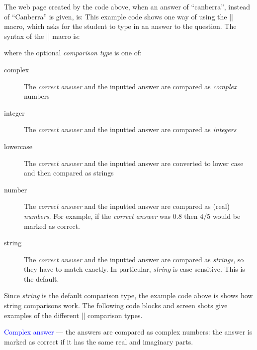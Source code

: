 \documentclass[svgnames]{article}
\begin{document}
  The web page created by the code above, when an answer of
  ``canberra'', instead of ``Canberra'' is given, is:
  This example code shows one way of using the \LatexCode|\answer| macro, which
  asks for the student to type in an answer to the question. The syntax of the
  \LatexCode|\answer| macro is:
  \begin{latexcode}
  \end{latexcode}
  where the optional \textit{comparison type} is one of:
  \begin{description}
      \item[complex] 
      The \textit{correct answer} and the inputted answer
      are compared as \textit{complex} numbers
      \item[integer] 
      The \textit{correct answer} and the inputted answer
      are compared as \textit{integers}
      \item[lowercase] 
      The \textit{correct answer} and the inputted answer
      are converted to lower case and then compared as strings
      \item[number] 
      The \textit{correct answer} and the inputted answer
      are compared as (real) \textit{numbers}. For example, if the
      \textit{correct answer} was $0.8$ then $4/5$ would be marked as
      correct.
      \item[string] 
      The \textit{correct answer} and the inputted answer are compared
      as \textit{strings}, so they have to match exactly. In particular,
      \textit{string} is case sensitive. This is the default.
  \end{description}

  Since \textit{string} is the default comparison type, the example
  code above is shows how string comparisons work. The following code
  blocks and screen shots give examples of the different \LatexCode|\answer|
  comparison types.

  \textcolor{blue}{Complex answer} --- the answers are compared as complex
  numbers: the answer is marked as correct if it has the same real and
  imaginary parts.
\end{document}
